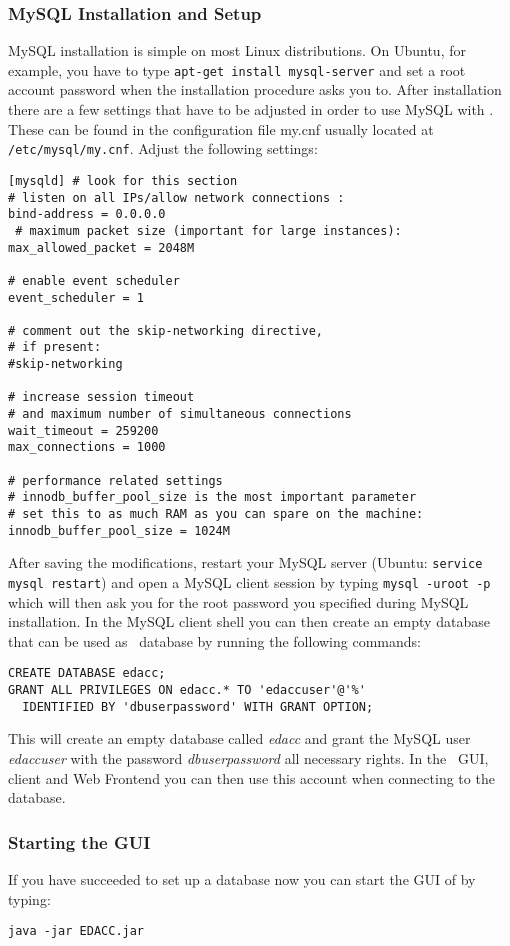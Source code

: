 \subsubsection{MySQL Installation and Setup}
\label{mysqlsetup}
MySQL installation is simple on most Linux distributions. On Ubuntu, for example, you
have to type \texttt{apt-get install mysql-server} and set a root account password
when the installation procedure asks you to.
 After installation there are a few settings
that have to be adjusted in order to use MySQL with \edacc. These can be found in the configuration file
my.cnf usually located at \texttt{/etc/mysql/my.cnf}. Adjust the following settings:
\begin{verbatim}
[mysqld] # look for this section
# listen on all IPs/allow network connections :
bind-address = 0.0.0.0
 # maximum packet size (important for large instances):
max_allowed_packet = 2048M

# enable event scheduler
event_scheduler = 1

# comment out the skip-networking directive,
# if present:
#skip-networking

# increase session timeout
# and maximum number of simultaneous connections
wait_timeout = 259200
max_connections = 1000

# performance related settings
# innodb_buffer_pool_size is the most important parameter
# set this to as much RAM as you can spare on the machine:
innodb_buffer_pool_size = 1024M
\end{verbatim}
After saving the modifications, restart your MySQL server (Ubuntu: \texttt{service mysql restart})
and open a MySQL client session by typing \texttt{mysql -uroot -p} which will then ask you for
the root password you specified during MySQL installation.
In the MySQL client shell you can then create an empty database that can be used as \edacc~database
by running the following commands:
\begin{verbatim}
CREATE DATABASE edacc;
GRANT ALL PRIVILEGES ON edacc.* TO 'edaccuser'@'%'
  IDENTIFIED BY 'dbuserpassword' WITH GRANT OPTION;
\end{verbatim}
This will create an empty database called \textit{edacc} and grant the MySQL user \textit{edaccuser}
with the password \textit{dbuserpassword} all necessary rights. In the \edacc~GUI, client and Web Frontend
you can then use this account when connecting to the database.

\subsubsection{Starting the GUI}
If you have succeeded to set up a database now you can start the GUI of \edacc by typing:
\begin{verbatim}
java -jar EDACC.jar
\end{verbatim} 
